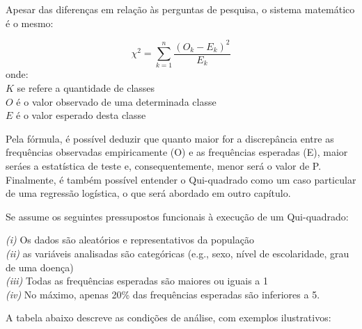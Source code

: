 \documentclass[
]{book}
\begin{document}
Apesar das diferenças em relação às perguntas de pesquisa, o sistema matemático é o mesmo:

\[\chi^2=\sum_{k=1}^{n} \frac{(O_k - E_k)^2}{E_k}\]
onde:\\
\(K\) se refere a quantidade de classes\\
\(O\) é o valor observado de uma determinada classe\\
\(E\) é o valor esperado desta classe

Pela fórmula, é possível deduzir que quanto maior for a discrepância entre as frequências observadas empiricamente (O) e as frequências esperadas (E), maior seráes a estatística de teste e, consequentemente, menor será o valor de P. Finalmente, é também possível entender o Qui-quadrado como um caso particular de uma regressão logística, o que será abordado em outro capítulo.

Se assume os seguintes pressupostos funcionais à execução de um Qui-quadrado:

\emph{(i)} Os dados são aleatórios e representativos da população\\
\emph{(ii)} as variáveis analisadas são categóricas (e.g., sexo, nível de escolaridade, grau de uma doença)\\
\emph{(iii)} Todas as frequências esperadas são maiores ou iguais a 1\\
\emph{(iv)} No máximo, apenas 20\% das frequências esperadas são inferiores a 5.

A tabela abaixo descreve as condições de análise, com exemplos ilustrativos:
\end{document}
